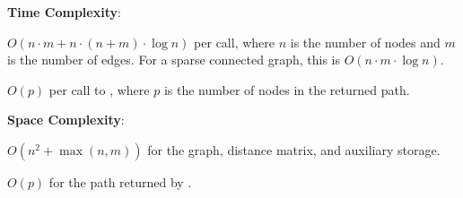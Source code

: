 \textbf{Time Complexity}:
\begin{compactitem}
  \item $O(n \cdot m + n \cdot (n + m) \cdot \log n)$ per call, where $n$ is the number of nodes and $m$ is the number of edges. For a sparse connected graph, this is $O(n \cdot m \cdot \log n)$.
  \item $O(p)$ per call to , where $p$ is the number of nodes in the returned path.
\end{compactitem}

\textbf{Space Complexity}:
\begin{compactitem}
  \item $O(n^{2} + \max\left(n, m\right))$ for the graph, distance matrix, and auxiliary storage.
  \item $O(p)$ for the path returned by .
\end{compactitem}

